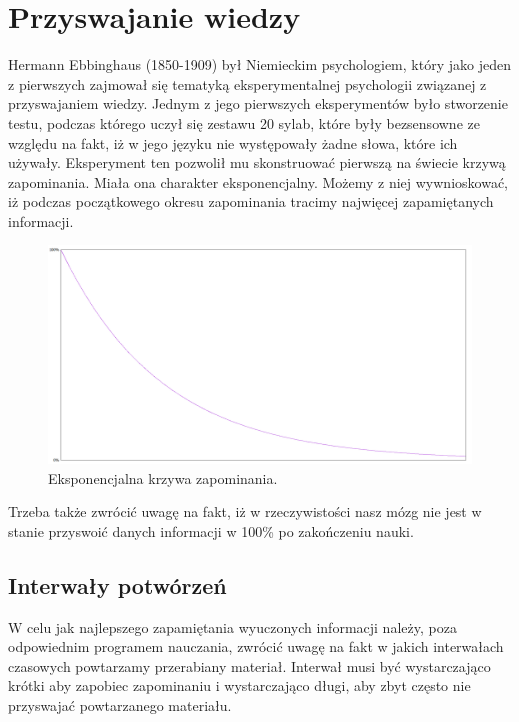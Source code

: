 {\let\cleardoublepage\relax \chapter{Przyswajanie wiedzy}}


Hermann Ebbinghaus\cite{HumanMemory} (1850-1909) był Niemieckim psychologiem, który jako jeden z pierwszych zajmował się tematyką eksperymentalnej psychologii związanej z przyswajaniem wiedzy. 
Jednym z jego pierwszych eksperymentów było stworzenie testu, podczas którego uczył się zestawu 20 sylab, które były bezsensowne ze względu na fakt, iż w jego języku nie występowały żadne słowa, które ich używały.
Eksperyment ten pozwolił mu skonstruować pierwszą na świecie krzywą zapominania. Miała ona charakter eksponencjalny.  Możemy z niej wywnioskować, iż podczas początkowego okresu zapominania tracimy najwięcej zapamiętanych informacji.

\begin{figure}[h]
	\centering
	\includegraphics[width=\textwidth]{images/curve.png}
	 \caption{Eksponencjalna krzywa zapominania.}
\end{figure}

Trzeba także zwrócić uwagę na fakt, iż w rzeczywistości\cite{ForgettingCurve} nasz mózg nie jest w stanie przyswoić danych informacji w 100\% po zakończeniu nauki. 

\section{Interwały potwórzeń}

W celu jak najlepszego zapamiętania wyuczonych informacji należy, poza odpowiednim programem nauczania, zwrócić uwagę na fakt w jakich interwałach czasowych powtarzamy przerabiany materiał\cite{ForgettingCurve}.
Interwał musi być wystarczająco krótki aby zapobiec zapominaniu i wystarczająco długi, aby zbyt często nie przyswajać powtarzanego materiału.



